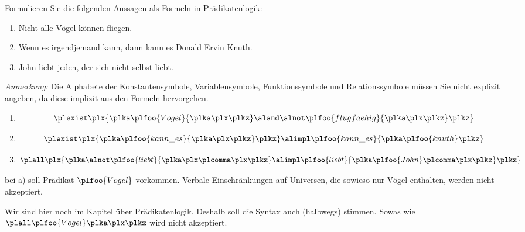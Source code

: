 \documentclass[12pt]{article}
\begin{document}

\begin{aufgabe}[2 + 2 + 2 = 6][Physik]
  Formulieren Sie die folgenden Aussagen als Formeln in Prädikatenlogik:
  \begin{enumerate}
    \item Nicht alle Vögel können fliegen.
    \item Wenn es irgendjemand kann, dann kann es Donald Ervin Knuth.
    \item John liebt jeden, der sich nicht selbst liebt.
  \end{enumerate}
  \emph{Anmerkung:} Die Alphabete der Konstantensymbole, Variablensymbole, Funktionssymbole und Relationssymbole müssen Sie nicht explizit angeben, da diese implizit aus den Formeln hervorgehen.
\end{aufgabe}

\begin{loesung}
  \begin{enumerate}
    \item
          \begin{equation*}
            \plexist \plx {\plka \plfoo{Vogel}{\plka \plx \plkz} \aland \alnot \plfoo{flugfaehig}{\plka \plx \plkz} \plkz}
          \end{equation*}
    \item
          \begin{equation*}
            \plexist \plx {\plka \plfoo{kann\_es}{\plka \plx \plkz} \plkz}
            \alimpl
            \plfoo{kann\_es}{\plka \plfoo{knuth} \plkz}
          \end{equation*}
    \item
          \begin{equation*}
            \plall \plx {\plka \alnot \plfoo{liebt}{\plka \plx \plcomma \plx \plkz} \alimpl \plfoo{liebt}{\plka \plfoo{John} \plcomma \plx \plkz} \plkz}
          \end{equation*}
  \end{enumerate}

  \begin{korrektur}
    \ZB bei a) soll Prädikat $\plfoo{Vogel}$ vorkommen. Verbale
    Einschränkungen auf \zB Universen, die sowieso nur Vögel
    enthalten, werden nicht akzeptiert.

    Wir sind hier noch im Kapitel über Prädikatenlogik. Deshalb soll
    die Syntax auch (halbwegs) stimmen. Sowas wie
    $\plall \plfoo{Vogel}\plka\plx\plkz$ wird nicht akzeptiert.
  \end{korrektur}
\end{loesung}
\end{document}

